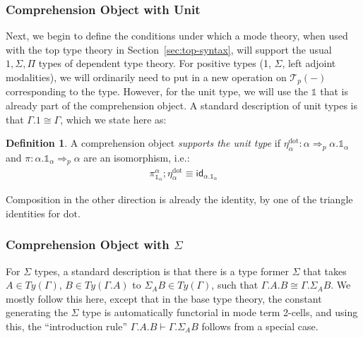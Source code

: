 \documentclass[10pt]{article}
\theoremstyle{definition}
\newtheorem{definition}{Definition}
\newcommand{\tcell}{\Rightarrow}
\newcommand{\id}{\mathsf{id}}
\newcommand\El[2]{\mathcal{T}_{#1}(#2)}
\newcommand{\sdot}{\ensuremath{\mathrm{dot}}}
\newcommand\One{\ensuremath{\mathds{1}}}
\begin{document}
\subsubsection[\dots with Unit]{Comprehension Object with Unit}

Next, we begin to define the conditions under which a mode theory, when
used with the top type theory in Section~\ref{sec:top-syntax}, will
support the usual $1, \Sigma, \Pi$ types of dependent type theory.  For
positive types (1, $\Sigma$, left adjoint modalities), we will
ordinarily need to put in a new operation on $\El{p}{-}$ corresponding
to the type.  However, for the unit type, we will use the $\One$ that is
already part of the comprehension object.  A standard description of
unit types is that $\Gamma.1 \cong \Gamma$, which we state here as:
\begin{definition}\label{def:supports-unit}
A comprehension object \emph{supports the unit type} if
$\eta^\sdot_\alpha : \alpha \tcell_p \alpha.\One_\alpha$ and $\pi :
\alpha.\One_\alpha \tcell_p \alpha$ are an isomorphism, i.e.:
\begin{align}
\pi^\alpha_{\One_\alpha} ; \eta^\sdot_\alpha \equiv \id_{\alpha.\One_\alpha}
\end{align}
\end{definition}
Composition in the other direction is already the identity, by one of the triangle identities for $\sdot$.

\subsubsection[\dots with $\Sigma$]{Comprehension Object with $\Sigma$}
\label{sec:compobj-sigma}

For $\Sigma$ types, a standard description is that there is a type
former $\Sigma$ that takes $A \in Ty(\Gamma)$, $B \in Ty(\Gamma.A)$ to
$\Sigma_A B \in Ty(\Gamma)$, such that $\Gamma.A.B \cong \Gamma.\Sigma_A
B$.  We mostly follow this here, except that in the base type theory,
the constant generating the $\Sigma$ type is automatically functorial in
mode term 2-cells, and using this, the ``introduction rule''
$\Gamma.A.B \vdash \Gamma.\Sigma_A B$ follows from a special case.
\end{document}

